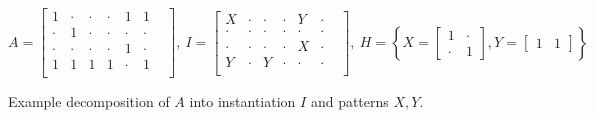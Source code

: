 \small
$$
A =
\begin{bmatrix}
1 & \cdot & \cdot & \cdot & 1 & 1 &  \\[-.5em]
\cdot & 1 & \cdot & \cdot & \cdot & \cdot &  \\[-.5em]
\cdot & \cdot & \cdot & \cdot & 1 & \cdot &  \\[-.5em]
1 & 1 & 1 & 1 & \cdot & 1 \\[-.25em]
\end{bmatrix}\!\!, \
I = 
\begin{bmatrix}
X & \cdot & \cdot & \cdot & Y & \cdot & \\[-.5em]
\cdot & \cdot & \cdot & \cdot & \cdot & \cdot &  \\[-.5em]
\cdot & \cdot & \cdot & \cdot & X & \cdot &  \\[-.5em]
Y & \cdot & Y & \cdot & \cdot & \cdot \\[-.25em]
\end{bmatrix}\!\!, \
H = \left\{
X =
\begin{bmatrix}
1 & \cdot \\[-.2em]
\cdot & 1
\end{bmatrix}\!\!,
Y =
\begin{bmatrix}
1 & 1
\end{bmatrix}\right\}
$$
\caption{Example decomposition of $A$ into instantiation $I$ and patterns $X,Y$.}
